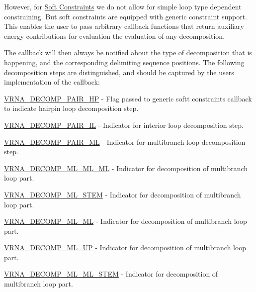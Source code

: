 However, for \hyperlink{group__soft__constraints}{Soft Constraints} we do not allow for simple loop type dependent constraining. But soft constraints are equipped with generic constraint support. This enables the user to pass arbitrary callback functions that return auxiliary energy contributions for evaluation the evaluation of any decomposition.

The callback will then always be notified about the type of decomposition that is happening, and the corresponding delimiting sequence positions. The following decomposition steps are distinguished, and should be captured by the user\textquotesingle{}s implementation of the callback\+:


\begin{DoxyItemize}
\item \hyperlink{group__constraints_ga8bd41ebc8039378d242e4e8c273716a5}{V\+R\+N\+A\+\_\+\+D\+E\+C\+O\+M\+P\+\_\+\+P\+A\+I\+R\+\_\+\+HP} -\/ Flag passed to generic softt constraints callback to indicate hairpin loop decomposition step.
\item \hyperlink{group__constraints_gaeab04f34d7730cff2d651d782f95d857}{V\+R\+N\+A\+\_\+\+D\+E\+C\+O\+M\+P\+\_\+\+P\+A\+I\+R\+\_\+\+IL} -\/ Indicator for interior loop decomposition step.
\item \hyperlink{group__constraints_gaa15b1185673f0b9e900c4748d45f388f}{V\+R\+N\+A\+\_\+\+D\+E\+C\+O\+M\+P\+\_\+\+P\+A\+I\+R\+\_\+\+ML} -\/ Indicator for multibranch loop decomposition step.
\item \hyperlink{group__constraints_ga735517266f2e35e1374b8f1ea77ef23e}{V\+R\+N\+A\+\_\+\+D\+E\+C\+O\+M\+P\+\_\+\+M\+L\+\_\+\+M\+L\+\_\+\+ML} -\/ Indicator for decomposition of multibranch loop part.
\item \hyperlink{group__constraints_ga4a23054c75d8efc785de50e3ea87602f}{V\+R\+N\+A\+\_\+\+D\+E\+C\+O\+M\+P\+\_\+\+M\+L\+\_\+\+S\+T\+EM} -\/ Indicator for decomposition of multibranch loop part.
\item \hyperlink{group__constraints_ga7f4cb9ff7a33e67f0539bd39e7b19a78}{V\+R\+N\+A\+\_\+\+D\+E\+C\+O\+M\+P\+\_\+\+M\+L\+\_\+\+ML} -\/ Indicator for decomposition of multibranch loop part.
\item \hyperlink{group__constraints_gae6478dda14e50e2f2cb9ef333a29256e}{V\+R\+N\+A\+\_\+\+D\+E\+C\+O\+M\+P\+\_\+\+M\+L\+\_\+\+UP} -\/ Indicator for decomposition of multibranch loop part.
\item \hyperlink{group__constraints_ga63d8ceb8c96ae3b463e529e28cc0fe98}{V\+R\+N\+A\+\_\+\+D\+E\+C\+O\+M\+P\+\_\+\+M\+L\+\_\+\+M\+L\+\_\+\+S\+T\+EM} -\/ Indicator for decomposition of multibranch loop part.

\end{DoxyItemize}
